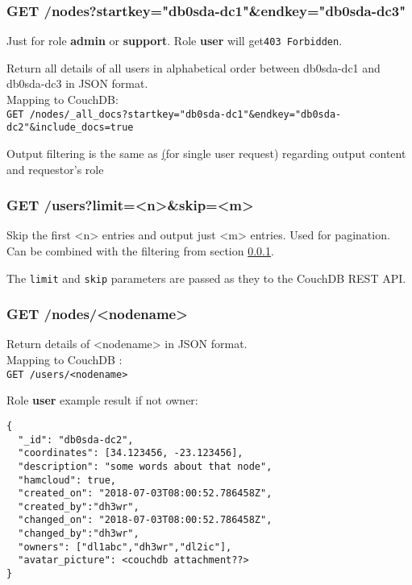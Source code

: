 \subsubsection{GET /nodes?startkey="db0sda-dc1"\&endkey="db0sda-dc3"}
\label{protocoldef:microservicesapi:database:filternodename}
Just for role \textbf{admin} or \textbf{support}. Role \textbf{user} will get\verb|403 Forbidden|.

Return all details of all users in alphabetical order between db0sda-dc1 and db0sda-dc3 in JSON format.\\
Mapping to CouchDB:\\
\verb|GET /nodes/_all_docs?startkey="db0sda-dc1"&endkey="db0sda-dc2"&include_docs=true|

Output filtering is the same as \hyperref[protocoldef:microservicesapi:database:getnodes](for single user request) regarding output content and requestor's role

\subsubsection{GET /users?limit=<n>\&skip=<m>}
Skip the first <n> entries and output just <m> entries. Used for pagination. Can be combined with the filtering from section \ref{protocoldef:microservicesapi:database:filternodename}.

The \verb|limit| and \verb|skip| parameters are passed as they to the CouchDB REST API.


\subsubsection{GET /nodes/<nodename>}
\label{protocoldef:microservicesapi:database:getnodename}

Return details of <nodename> in JSON format.\\
Mapping to CouchDB :\\
\verb|GET /users/<nodename>|

Role \textbf{user} example result if not owner:
\begin{lstlisting}
{
  "_id": "db0sda-dc2",
  "coordinates": [34.123456, -23.123456],
  "description": "some words about that node",
  "hamcloud": true,
  "created_on": "2018-07-03T08:00:52.786458Z",
  "created_by":"dh3wr",
  "changed_on": "2018-07-03T08:00:52.786458Z",
  "changed_by":"dh3wr",
  "owners": ["dl1abc","dh3wr","dl2ic"],
  "avatar_picture": <couchdb attachment??>
}
\end{lstlisting}


